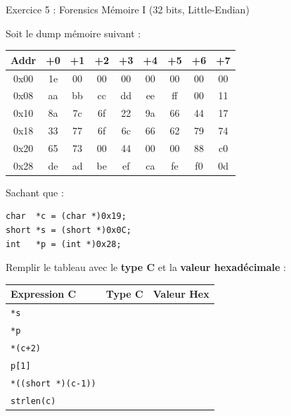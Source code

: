 \documentclass[10pt,a4paper]{article}
\begin{document}
\begin{exercicebox}{Exercice 5 : Forensics Mémoire I (32 bits, Little-Endian)}

Soit le dump mémoire suivant :

\begin{center}
\renewcommand{\arraystretch}{1.2}
\begin{tabular}{|c|c|c|c|c|c|c|c|c|}
\hline
\textbf{Addr} & \textbf{+0} & \textbf{+1} & \textbf{+2} & \textbf{+3} & \textbf{+4} & \textbf{+5} & \textbf{+6} & \textbf{+7} \\
\hline
0x00 & 1e & 00 & 00 & 00 & 00 & 00 & 00 & 00 \\
\hline
0x08 & aa & bb & cc & dd & ee & ff & 00 & 11 \\
\hline
0x10 & 8a & 7c & 6f & 22 & 9a & 66 & 44 & 17 \\
\hline
0x18 & 33 & 77 & 6f & 6c & 66 & 62 & 79 & 74 \\
\hline
0x20 & 65 & 73 & 00 & 44 & 00 & 00 & 88 & c0 \\
\hline
0x28 & de & ad & be & ef & ca & fe & f0 & 0d \\
\hline
\end{tabular}
\end{center}

Sachant que :
\begin{lstlisting}[numbers=none]
char  *c = (char *)0x19;
short *s = (short *)0x0C;
int   *p = (int *)0x28;
\end{lstlisting}

Remplir le tableau avec le \textbf{type C} et la \textbf{valeur hexadécimale} :

\begin{center}
\renewcommand{\arraystretch}{1.5}
\begin{tabular}{|l|c|c|}
\hline
\textbf{Expression C} & \textbf{Type C} & \textbf{Valeur Hex} \\
\hline
\texttt{*s} & & \\
\hline
\texttt{*p} & & \\
\hline
\texttt{*(c+2)} & & \\
\hline
\texttt{p[1]} & & \\
\hline
\texttt{*((short *)(c-1))} & & \\
\hline
\texttt{strlen(c)} & & \\
\hline
\end{tabular}
\end{center}

\end{exercicebox}
\end{document}
